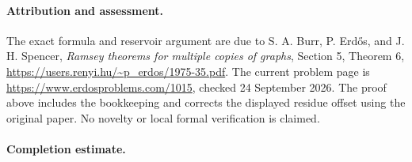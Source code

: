 \paragraph{Attribution and assessment.}
The exact formula and reservoir argument are due to S. A. Burr, P. Erd\H{o}s, and J. H. Spencer, \emph{Ramsey theorems for multiple copies of graphs}, Section 5, Theorem 6, \url{https://users.renyi.hu/~p_erdos/1975-35.pdf}. The current problem page is \url{https://www.erdosproblems.com/1015}, checked 24 September 2026. The proof above includes the bookkeeping and corrects the displayed residue offset using the original paper. No novelty or local formal verification is claimed.

\paragraph{Completion estimate.}
